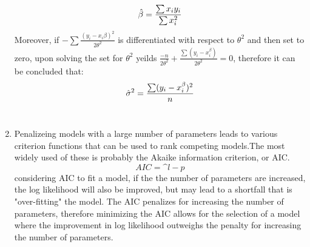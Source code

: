 \documentclass{article}
\begin{document}
\begin{enumerate}
    \begin{equation}
    \hat{\beta }=\frac{\sum x_iy_i}{\sum x_i^2}  \\
    \end{equation}
Moreover, if $-\sum \frac{(y_{i}-x_{i}\beta)^2}{2\theta^2}$ is differentiated with respect to $\theta^2$ and then set to zero, upon solving the set for $\theta^2$ yeilds $\frac{-n}{2\theta^2}+\frac{\sum (y_{i}-x_{i}^\beta)}{2\theta^2}=0$, therefore it can be concluded that:
    \begin{equation}
    \hat{\sigma }^2=\frac{\sum (y_i-x_i^\beta )^2}{n} \\
        \end{equation}
        \hspace{1.27cm}\\
        \item Penalizeing models with a large number of parameters leads to various criterion functions that can be used to rank competing models.The most widely used of these is probably the Akaike information criterion, or AIC.
        \begin{equation}
            AIC = \^{l} - p
        \end{equation} considering AIC to fit a model, if the the number of parameters are increased, the log likelihood will also be improved, but may lead to a shortfall that is "over-fitting" the model. The AIC penalizes for increasing the number of parameters, therefore minimizing the AIC allows for the selection of a model where the improvement in log likelihood outweighs the penalty for increasing the number of parameters.
    
\end{enumerate}
\newpage
\end{document}
